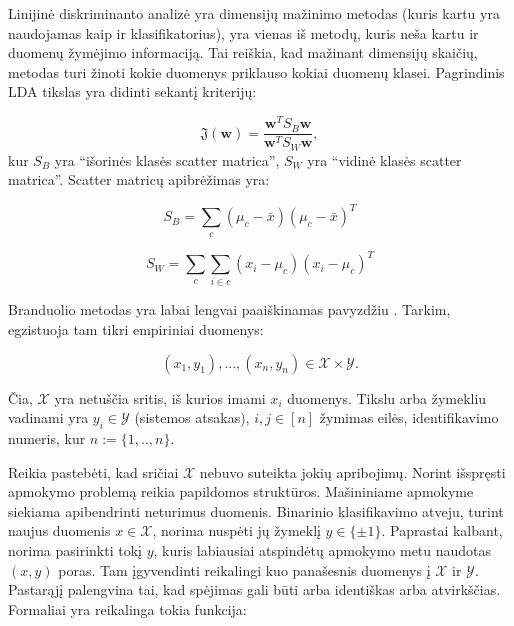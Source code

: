 \documentclass[]{vgtuef}
\begin{document}
Linijinė diskriminanto analizė yra dimensijų mažinimo metodas (kuris kartu yra naudojamas kaip ir klasifikatorius), yra vienas iš metodų, kuris neša kartu ir duomenų žymėjimo informaciją. Tai reiškia, kad mažinant dimensijų skaičių, metodas turi žinoti kokie duomenys priklauso kokiai duomenų klasei. Pagrindinis LDA tikslas yra didinti sekantį kriterijų:

\begin{equation}
  \mathfrak{J}(\mathbf{w}) = \frac{ \mathbf{w}^T S_B \mathbf{w} }{
    \mathbf{w}^T S_W \mathbf{w} },
\end{equation}
kur $S_B$ yra ``išorinės klasės scatter matrica'', $S_W$ yra ``vidinė klasės scatter matrica''. Scatter matricų apibrėžimas yra:

\begin{equation}
  S_B = \sum_c (\mu_c - \bar{x})(\mu_c - \bar{x})^T
\end{equation}

\begin{equation}
  S_W = \sum_c \sum_{i \in c} ( x_i - \mu_c)(x_i - \mu_c)^T
\end{equation}


Branduolio metodas yra labai lengvai paaiškinamas pavyzdžiu \cite{2007math......1907H}. Tarkim, egzistuoja tam tikri empiriniai duomenys:

\begin{equation}
  (x_1,y_1),...,(x_n,y_n) \in \mathcal{X} \times \mathcal{Y}.
\end{equation}

Čia, $\mathcal{X}$ yra netuščia sritis, iš kurios imami $x_i$ duomenys. Tikslu arba žymekliu vadinami yra $y_i \in \mathcal{Y}$ (sistemos atsakas), $i,j \in [n]$ žymimas eilės, identifikavimo numeris, kur $n := \{1,..,n\}$.

Reikia pastebėti, kad sričiai $\mathcal{X}$ nebuvo suteikta jokių apribojimų. Norint išspręsti apmokymo problemą reikia papildomos struktūros. Mašininiame apmokyme siekiama apibendrinti neturimus duomenis. Binarinio klasifikavimo atveju, turint naujus duomenis $x \in \mathcal{X}$, norima nuspėti jų žymeklį $y \in \{\pm 1\}$. Paprastai kalbant, norima pasirinkti tokį $y$, kuris labiausiai atspindėtų apmokymo metu naudotas $(x,y)$ poras. Tam įgyvendinti reikalingi kuo panašesnis duomenys į $\mathcal{X}$ ir $\mathcal{Y}$. Pastarąjį palengvina tai, kad spėjimas gali būti arba identiškas arba atvirkščias. Formaliai yra reikalinga tokia funkcija:
\end{document}
